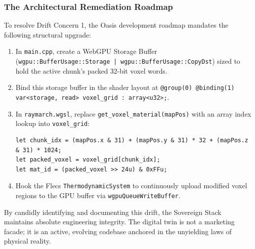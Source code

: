 \subsubsection{The Architectural Remediation Roadmap}
To resolve Drift Concern 1, the Oasis development roadmap mandates the following structural upgrade:
\begin{enumerate}
    \item In \texttt{main.cpp}, create a WebGPU Storage Buffer (\texttt{wgpu::BufferUsage::Storage | wgpu::BufferUsage::CopyDst}) sized to hold the active chunk's packed 32-bit voxel words.
    \item Bind this storage buffer in the shader layout at \texttt{@group(0) @binding(1) var\textless storage, read\textgreater{} voxel\_grid : array\textless u32\textgreater{};}.
    \item In \texttt{raymarch.wgsl}, replace \texttt{get\_voxel\_material(mapPos)} with an array index lookup into \texttt{voxel\_grid}:
\begin{verbatim}
let chunk_idx = (mapPos.x & 31) + (mapPos.y & 31) * 32 + (mapPos.z & 31) * 1024;
let packed_voxel = voxel_grid[chunk_idx];
let mat_id = (packed_voxel >> 24u) & 0xFFu;
\end{verbatim}
    \item Hook the Flecs \texttt{ThermodynamicSystem} to continuously upload modified voxel regions to the GPU buffer via \texttt{wgpuQueueWriteBuffer}.
\end{enumerate}

By candidly identifying and documenting this drift, the Sovereign Stack maintains absolute engineering integrity. The digital twin is not a marketing facade; it is an active, evolving codebase anchored in the unyielding laws of physical reality.
